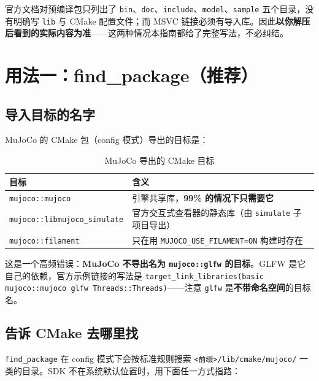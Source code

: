 \begin{note}
	官方文档对预编译包只列出了 \texttt{bin}、\texttt{doc}、\texttt{include}、\texttt{model}、\texttt{sample} 五个目录，没有明确写 \texttt{lib} 与 CMake 配置文件；而 MSVC 链接必须有导入库。因此\textbf{以你解压后看到的实际内容为准}——这两种情况本指南都给了完整写法，不必纠结。
\end{note}

\section{用法一：find\_package（推荐）}

\subsection{导入目标的名字}

MuJoCo 的 CMake 包（config 模式）导出的目标是：

\begin{table}[H]
	\centering
	\caption{MuJoCo 导出的 CMake 目标}
	\label{tab:CMake:目标}
	\footnotesize
	\begin{tabular}{>{\raggedright\arraybackslash}p{5.4cm}>{\raggedright\arraybackslash}p{8.8cm}}
		\hline
		目标 & 含义 \\
		\hline
		\texttt{mujoco::mujoco} & 引擎共享库，\textbf{99\% 的情况下只需要它} \\
		\texttt{mujoco::libmujoco\_simulate} & 官方交互式查看器的静态库（由 \texttt{simulate} 子项目导出） \\
		\texttt{mujoco::filament} & 只在用 \texttt{MUJOCO\_USE\_FILAMENT=ON} 构建时存在 \\
		\hline
	\end{tabular}
\end{table}

\begin{warnbox}
	这是一个高频错误：\textbf{MuJoCo 不导出名为 \texttt{mujoco::glfw} 的目标}。GLFW 是它自己的依赖，官方示例链接的写法是
	\texttt{target\_link\_libraries(basic mujoco::mujoco glfw Threads::Threads)}——注意 \texttt{glfw} 是\textbf{不带命名空间}的目标名。
\end{warnbox}

\subsection{告诉 CMake 去哪里找}

\texttt{find\_package} 在 config 模式下会按标准规则搜索 \texttt{<前缀>/lib/cmake/mujoco/} 一类的目录。SDK 不在系统默认位置时，用下面任一方式指路：


